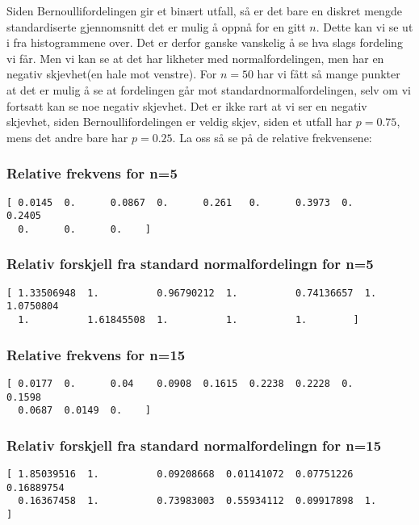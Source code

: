 \documentclass[a4paper,norsk, 10pt]{article}
\begin{document}
Siden Bernoullifordelingen gir et binært utfall, så er det bare en diskret mengde standardiserte gjennomsnitt det er mulig å oppnå for en gitt $n$. Dette kan vi se ut i fra histogrammene over. Det er derfor ganske vanskelig å se hva slags fordeling vi får. Men vi kan se at det har likheter med normalfordelingen, men har en negativ skjevhet(en hale mot venstre). For $n = 50$ har vi fått så mange punkter at det er mulig å se at fordelingen går mot standardnormalfordelingen, selv om vi fortsatt kan se noe negativ skjevhet. Det er ikke rart at vi ser en negativ skjevhet, siden Bernoullifordelingen er veldig skjev, siden et utfall har $p = 0.75$, mens det andre bare har $p = 0.25$. La oss så se på de relative frekvensene:

\subsubsection*{Relative frekvens for n=5}
\begin{Verbatim}[frame = single]
[ 0.0145  0.      0.0867  0.      0.261   0.      0.3973  0.      0.2405
  0.      0.      0.    ]

\end{Verbatim}

\subsubsection*{Relativ forskjell fra standard normalfordelingn for n=5}
\begin{Verbatim}[frame = single]
[ 1.33506948  1.          0.96790212  1.          0.74136657  1.          1.0750804
  1.          1.61845508  1.          1.          1.        ]
\end{Verbatim}

\subsubsection*{Relative frekvens for n=15}
\begin{Verbatim}[frame = single]
[ 0.0177  0.      0.04    0.0908  0.1615  0.2238  0.2228  0.      0.1598
  0.0687  0.0149  0.    ]
\end{Verbatim}

\subsubsection*{Relativ forskjell fra standard normalfordelingn for n=15}
\begin{Verbatim}[frame = single]
[ 1.85039516  1.          0.09208668  0.01141072  0.07751226  0.16889754
  0.16367458  1.          0.73983003  0.55934112  0.09917898  1.        ]
\end{Verbatim}
\end{document}

